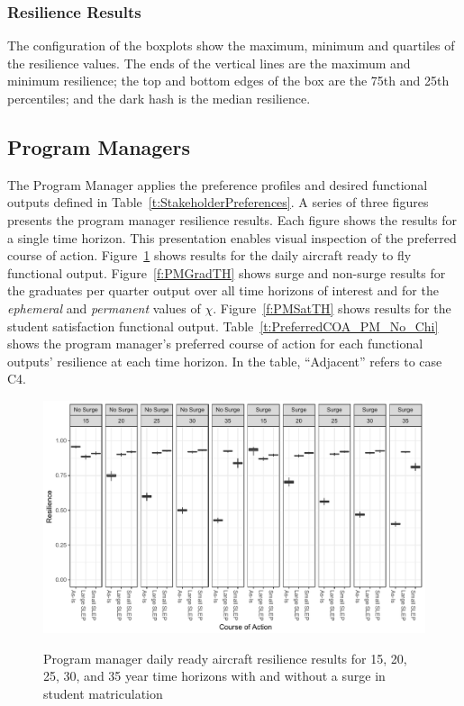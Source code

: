 \documentclass[preprint,12pt]{elsarticle}
\begin{document}
\subsubsection{Resilience Results}

The configuration of the boxplots show the maximum, minimum and
quartiles of the resilience values. The ends of the vertical lines are
the maximum and minimum resilience; the top and bottom edges  of the box are the
75th and 25th percentiles; and the dark hash is the median resilience.

\subsection{Program Managers}

The Program Manager applies the preference profiles and desired
functional outputs defined in
Table~\ref{t:StakeholderPreferences}. A series of three figures presents
the program manager resilience results. Each figure shows the results
for a single time horizon. This presentation enables visual inspection
of the preferred course of action.  Figure~\ref{f:PMAoTH} shows results for
the daily aircraft ready to fly functional
output. Figure~\ref{f:PMGradTH} shows surge and non-surge results for
the graduates per quarter output over all time horizons of interest
and for the \emph{ephemeral} and
\emph{permanent} values of $\chi$. Figure~\ref{f:PMSatTH} shows results for
the student satisfaction functional output. Table~\ref{t:PreferredCOA_PM_No_Chi} shows the program
manager's preferred course of action for each 
functional outputs' resilience at each time horizon. In the table,
``Adjacent'' refers to case C4.

\begin{landscape}
\begin{figure}[h]
  \begin{center}
    \includegraphics[width=8.2in]{PMAoTH}
  \end{center}
\begin{quote}
  \caption[Program manager aircraft resilience results]{Program
    manager daily ready aircraft resilience results for 15, 20, 25, 30, and 35 
    year time horizons with and without a surge in student
    matriculation
  \label{f:PMAoTH}}
\end{quote}
\end{figure}
\end{landscape}
\end{document}
